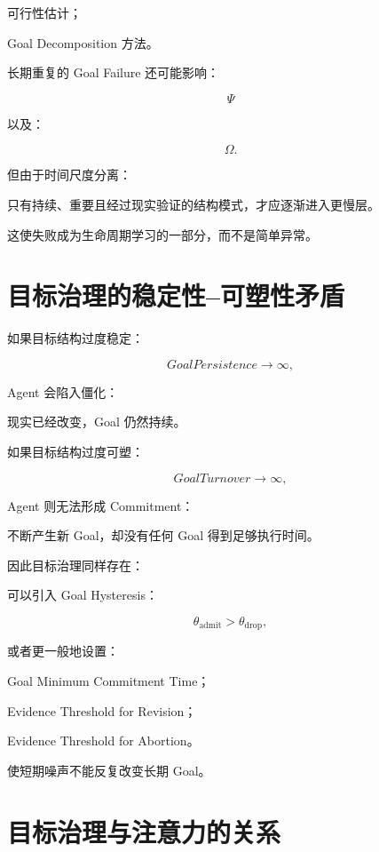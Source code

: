 可行性估计；

Goal Decomposition 方法。

长期重复的 Goal Failure 还可能影响：

\[
\Psi
\]

以及：

\[
\Omega.
\]

但由于时间尺度分离：

\begin{statementbox}
\centering
{}
\end{statementbox}

只有持续、重要且经过现实验证的结构模式，才应逐渐进入更慢层。

这使失败成为生命周期学习的一部分，而不是简单异常。


\section{目标治理的稳定性--可塑性矛盾}

如果目标结构过度稳定：

\[
GoalPersistence\rightarrow\infty,
\]

Agent 会陷入僵化：

现实已经改变，Goal 仍然持续。

如果目标结构过度可塑：

\[
GoalTurnover\rightarrow\infty,
\]

Agent 则无法形成 Commitment：

不断产生新 Goal，却没有任何 Goal 得到足够执行时间。

因此目标治理同样存在：

\begin{statementbox}
\centering
{}
\end{statementbox}

可以引入 Goal Hysteresis：

\[
\theta_{\mathrm{admit}}
>
\theta_{\mathrm{drop}},
\]

或者更一般地设置：

Goal Minimum Commitment Time；

Evidence Threshold for Revision；

Evidence Threshold for Abortion。

使短期噪声不能反复改变长期 Goal。


\section{目标治理与注意力的关系}

